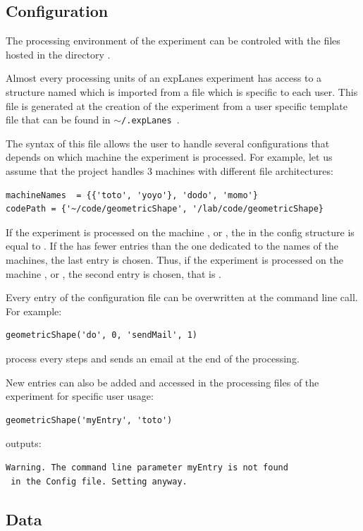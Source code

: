 \documentclass[a4paper,fleqn]{tufte-handout}
\newcommand{\explanes}{\textsf{expLanes} }
\begin{document}
\subsection{Configuration}

The processing environment of the experiment can be controled with the files hosted in the directory .

Almost every processing units of an \explanes experiment has access to a structure named  which is imported from a file which is specific to each user. This file is generated at the creation of the experiment from a user specific template file that can be found in \texttt{$\sim$/.\explanes}.

The syntax of this file allows the user to handle several configurations that depends on which machine the experiment is processed. For example, let us assume that the project handles 3 machines with different file architectures:
\begin{lstlisting}
machineNames  = {{'toto', 'yoyo'}, 'dodo', 'momo'}
codePath = {'~/code/geometricShape', '/lab/code/geometricShape}
\end{lstlisting}
If the experiment is processed on the machine , or , the  in the config structure is equal to .  If the  has fewer entries than the one dedicated to the names of the machines, the last entry is chosen. Thus, if the experiment is processed on the machine , or , the second entry is chosen, that is .

Every entry of the configuration file can be overwritten at the command line call. For example:
\begin{lstlisting}
geometricShape('do', 0, 'sendMail', 1)
\end{lstlisting}
process every steps and sends an email at the end of the processing.

New entries can also be added and accessed in the processing files of the experiment for specific user usage:
\begin{lstlisting}
geometricShape('myEntry', 'toto')
\end{lstlisting}
outputs:
\begin{lstlisting}
Warning. The command line parameter myEntry is not found
 in the Config file. Setting anyway.
\end{lstlisting}


\subsection{Data}
\end{document}
